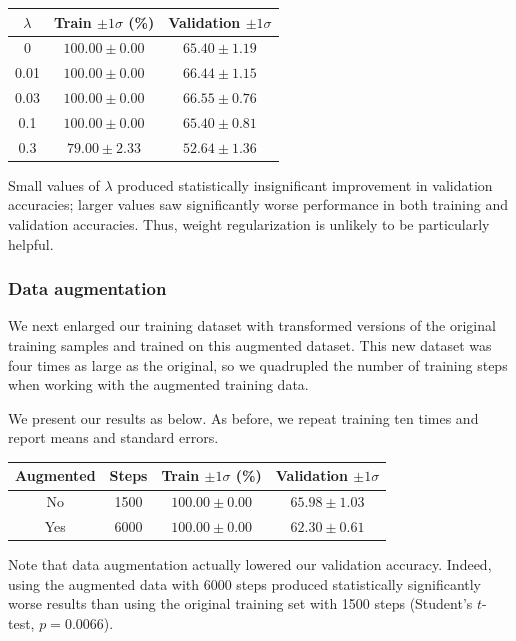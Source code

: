 \documentclass{article}
\begin{document}
\begin{multicols}{2}
\begin{center}
    \begin{tabular}{c|cc}
        $\lambda$ & Train $\pm 1 \sigma$ (\%) & Validation $\pm 1 \sigma$\\\hline
        0    & $100.00 \pm 0.00$ & $65.40 \pm 1.19$ \\
        0.01 & $100.00 \pm 0.00$ & $66.44 \pm 1.15$ \\
        0.03 & $100.00 \pm 0.00$ & $66.55 \pm 0.76$ \\
        0.1  & $100.00 \pm 0.00$ & $65.40 \pm 0.81$ \\
        0.3  &  $79.00 \pm 2.33$ & $52.64 \pm 1.36$ \\
    \end{tabular}
\end{center}
Small values of $\lambda$ produced
statistically insignificant improvement in validation accuracies;
larger values saw significantly worse performance
in both training and validation accuracies.
Thus, weight regularization
is unlikely to be particularly helpful.


\subsubsection{Data augmentation}

We next enlarged our training dataset
with transformed versions of the original training samples
and trained on this augmented dataset.
This new dataset was four times as large as the original,
so we quadrupled the number of training steps
when working with the augmented training data.

We present our results as below.
As before, we repeat training ten times
and report means and standard errors.
\begin{center}
    \begin{tabular}{cc|cc}
        Augmented & Steps & Train $\pm 1 \sigma$ (\%) & Validation $\pm 1 \sigma$\\\hline
        No  & 1500 & $100.00 \pm 0.00$ & $65.98 \pm 1.03$ \\
        Yes & 6000 & $100.00 \pm 0.00$ & $62.30 \pm 0.61$
    \end{tabular}
\end{center}

Note that data augmentation actually lowered our validation accuracy.
Indeed, using the augmented data with 6000 steps
produced statistically significantly worse results
than using the original training set with 1500 steps
(Student's $t$-test, $p=0.0066$).



\end{multicols}
\end{document}
